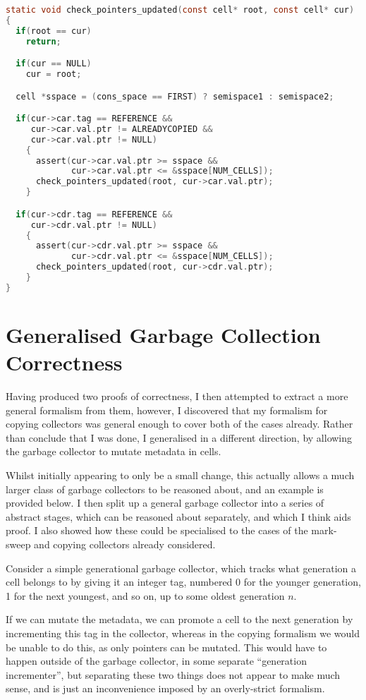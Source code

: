 \begin{lstlisting}[language=C,caption={Fenichel/Yochelson Pointer Checking}]
static void check_pointers_updated(const cell* root, const cell* cur)
{
  if(root == cur)
    return;

  if(cur == NULL)
    cur = root;

  cell *sspace = (cons_space == FIRST) ? semispace1 : semispace2;

  if(cur->car.tag == REFERENCE &&
     cur->car.val.ptr != ALREADYCOPIED &&
     cur->car.val.ptr != NULL)
    {
      assert(cur->car.val.ptr >= sspace &&
             cur->car.val.ptr <= &sspace[NUM_CELLS]);
      check_pointers_updated(root, cur->car.val.ptr);
    }

  if(cur->cdr.tag == REFERENCE &&
     cur->cdr.val.ptr != NULL)
    {
      assert(cur->cdr.val.ptr >= sspace &&
             cur->cdr.val.ptr <= &sspace[NUM_CELLS]);
      check_pointers_updated(root, cur->cdr.val.ptr);
    }
}
\end{lstlisting}

\section{Generalised Garbage Collection Correctness}
\label{sec:results-correctness}

Having produced two proofs of correctness, I then attempted to extract
a more general formalism from them, however, I discovered that my
formalism for copying collectors was general enough to cover both of
the cases already. Rather than conclude that I was done, I generalised
in a different direction, by allowing the garbage collector to mutate
metadata in cells.

Whilst initially appearing to only be a small change, this actually
allows a much larger class of garbage collectors to be reasoned
about, and an example is provided below. I then split up a general
garbage collector into a series of abstract stages, which can be
reasoned about separately, and which I think aids proof. I also showed
how these could be specialised to the cases of the mark-sweep and
copying collectors already considered.

\begin{example}
  Consider a simple generational garbage collector, which tracks what
  generation a cell belongs to by giving it an integer tag, numbered 0
  for the younger generation, 1 for the next youngest, and so on, up
  to some oldest generation $n$.

  If we can mutate the metadata, we can promote a cell to the next
  generation by incrementing this tag in the collector, whereas in the
  copying formalism we would be unable to do this, as only pointers
  can be mutated. This would have to happen outside of the garbage
  collector, in some separate ``generation incrementer'', but
  separating these two things does not appear to make much sense, and
  is just an inconvenience imposed by an overly-strict formalism.
\end{example}

